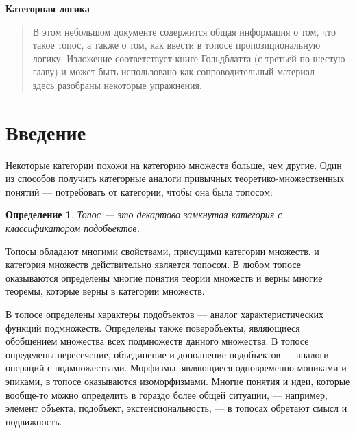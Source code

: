 \documentclass[a4paper, 12pt]{article}
\newtheorem{definition}{Определение}
\begin{document}
\begin{center}

\vspace{3.5cm}

{\Large\bfseries
Категорная логика
\par}
\vspace{1cm}
\begin{abstract}
В этом небольшом документе содержится общая информация о том, что такое топос, а также о том, как ввести в топосе пропозициональную логику. Изложение соответствует книге Гольдблатта (с третьей по шестую главу) и может быть использовано как сопроводительный материал --- здесь разобраны некоторые упражнения.
\end{abstract}

\vspace{5.5cm}

\tableofcontents
\end{center}
\thispagestyle{empty}
\pagebreak
\pagebreak

\section{Введение}

Некоторые категории похожи на категорию множеств больше, чем другие. Один из способов получить категорные аналоги привычных теоретико-множественных понятий --- потребовать от категории, чтобы она была топосом:

\begin{definition}
Топос --- это декартово замкнутая категория с классификатором подобъектов.
\end{definition}

Топосы обладают многими свойствами, присущими категории множеств, и категория множеств действительно является топосом. 
В любом топосе оказываются определены многие понятия теории множеств 
и верны многие теоремы, которые верны в категории множеств. 

В топосе определены характеры подобъектов --- аналог характеристических функций подмножеств. Определены также поверобъекты, являющиеся обобщением множества всех подмножеств данного множества. В топосе определены пересечение, объединение и дополнение подобъектов --- аналоги операций с подмножествами. Морфизмы, являющиеся одновременно мониками и эпиками, в топосе оказываются изоморфизмами. Многие понятия и идеи, которые вообще-то можно определить в гораздо более общей ситуации, --- например, элемент объекта, подобъект, экстенсиональность, --- в топосах обретают смысл и подвижность.
\end{document}
